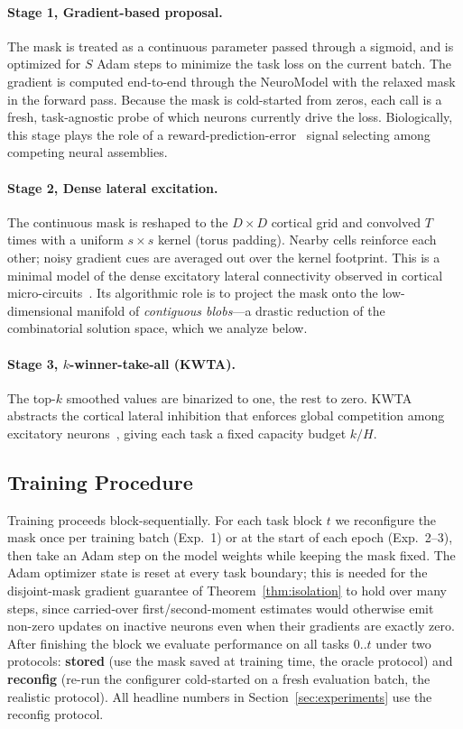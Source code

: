 \documentclass{article}
\begin{document}
\paragraph{Stage 1, Gradient-based proposal.}
The mask is treated as a continuous parameter passed through a sigmoid, and is optimized for $S$ Adam steps to minimize the task loss on the current batch. The gradient is computed end-to-end through the NeuroModel with the relaxed mask in the forward pass. Because the mask is cold-started from zeros, each call is a fresh, task-agnostic probe of which neurons currently drive the loss. Biologically, this stage plays the role of a reward-prediction-error~\citep{schultz1997neural} signal selecting among competing neural assemblies.

\paragraph{Stage 2, Dense lateral excitation.}
The continuous mask is reshaped to the $D\times D$ cortical grid and convolved $T$ times with a uniform $s\times s$ kernel (torus padding). Nearby cells reinforce each other; noisy gradient cues are averaged out over the kernel footprint. This is a minimal model of the dense excitatory lateral connectivity observed in cortical micro-circuits~\citep{gilbert1983clustered,douglas2004neuronal}. Its algorithmic role is to project the mask onto the low-dimensional manifold of \emph{contiguous blobs}---a drastic reduction of the combinatorial solution space, which we analyze below.

\paragraph{Stage 3, $k$-winner-take-all (KWTA).}
The top-$k$ smoothed values are binarized to one, the rest to zero. KWTA~\citep{maass2000computational} abstracts the cortical lateral inhibition that enforces global competition among excitatory neurons~\citep{douglas2004neuronal}, giving each task a fixed capacity budget $k/H$.

\subsection{Training Procedure}
\label{sec:training}

Training proceeds block-sequentially. For each task block $t$ we reconfigure the mask once per training batch (Exp.~1) or at the start of each epoch (Exp.~2--3), then take an Adam step on the model weights while keeping the mask fixed. The Adam optimizer state is reset at every task boundary; this is needed for the disjoint-mask gradient guarantee of Theorem~\ref{thm:isolation} to hold over many steps, since carried-over first/second-moment estimates would otherwise emit non-zero updates on inactive neurons even when their gradients are exactly zero. After finishing the block we evaluate performance on all tasks $0..t$ under two protocols: \textbf{stored} (use the mask saved at training time, the oracle protocol) and \textbf{reconfig} (re-run the configurer cold-started on a fresh evaluation batch, the realistic protocol). All headline numbers in Section~\ref{sec:experiments} use the reconfig protocol.
\end{document}
